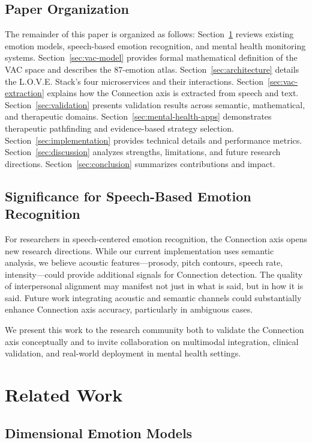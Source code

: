 \documentclass[10pt,twocolumn]{article}
\begin{document}
\subsection{Paper Organization}

The remainder of this paper is organized as follows: Section~\ref{sec:related-work} reviews existing emotion models, speech-based emotion recognition, and mental health monitoring systems. Section~\ref{sec:vac-model} provides formal mathematical definition of the VAC space and describes the 87-emotion atlas. Section~\ref{sec:architecture} details the L.O.V.E. Stack's four microservices and their interactions. Section~\ref{sec:vac-extraction} explains how the Connection axis is extracted from speech and text. Section~\ref{sec:validation} presents validation results across semantic, mathematical, and therapeutic domains. Section~\ref{sec:mental-health-apps} demonstrates therapeutic pathfinding and evidence-based strategy selection. Section~\ref{sec:implementation} provides technical details and performance metrics. Section~\ref{sec:discussion} analyzes strengths, limitations, and future research directions. Section~\ref{sec:conclusion} summarizes contributions and impact.

\subsection{Significance for Speech-Based Emotion Recognition}

For researchers in speech-centered emotion recognition, the Connection axis opens new research directions. While our current implementation uses semantic analysis, we believe acoustic features—prosody, pitch contours, speech rate, intensity—could provide additional signals for Connection detection. The quality of interpersonal alignment may manifest not just in what is said, but in how it is said. Future work integrating acoustic and semantic channels could substantially enhance Connection axis accuracy, particularly in ambiguous cases.

We present this work to the research community both to validate the Connection axis conceptually and to invite collaboration on multimodal integration, clinical validation, and real-world deployment in mental health settings.

\section{Related Work}
\label{sec:related-work}
\subsection{Dimensional Emotion Models}
\end{document}
